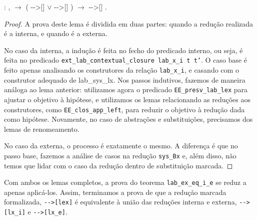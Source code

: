 \bigskip

\coqdocnoindent {} :
\coqdockw{\ensuremath{\forall}}  ,
  \ensuremath{\rightarrow} (
-{}->[]  \ensuremath{\lor} 
-{}->[] ) \ensuremath{\rightarrow} 
-{}->[] .\coqdoceol

\begin{addmargin}[1em]{2em}
\begin{proof}
A prova deste lema é dividida em duas partes: quando a redução realizada é a
interna, e quando é a externa. 

No caso da interna, a indução é feita no fecho do predicado interno, ou seja, é
feita no predicado \texttt{ext\_lab\_contextual\_closure lab\_x\_i t t'}. O caso
base é feito apenas analisando os construtores da relação \texttt{lab\_x\_i}, e
casando com o construtor adequado de lab\_sys\_lx. Nos passos indutivos, fazemos
de maneira análoga ao lema anterior: utilizamos agora o predicado
\texttt{EE\_presv\_lab\_lex} para ajustar o objetivo à hipótese, e utilizamos os
lemas relacionando as reduções aos construtores, como
\texttt{EE\_clos\_app\_left}, para reduzir o objetivo à redução dada como
hipótese. Novamente, no caso de abstrações e substituições, precisamos dos lemas
de renomeamento.

No caso da externa, o processo é exatamente o mesmo. A diferença é que no passo
base, fazemos a análise de casos na redução \texttt{sys\_Bx} e, além disso, não
temos que lidar com o caso da redução dentro de substituição marcada.
\end{proof}

\end{addmargin}

\bigskip

Com ambos os lemas completos, a prova do teorema \texttt{lab\_ex\_eq\_i\_e} se
reduz a apenas aplicá-los. Assim, terminamos a prova de que a redução marcada
formalizada, \texttt{-{}->[lex]} é equivalente à união das reduções interna
e externa, \texttt{-{}->[lx\_i]} e \texttt{-{}->[lx\_e]}.
